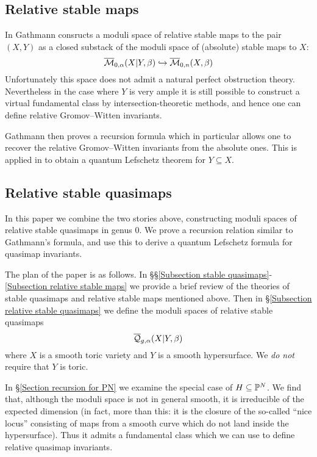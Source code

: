 \subsection{Relative stable maps}
In \cite{Ga} Gathmann consructs a moduli space of relative stable maps to the pair $(X,Y)$ as a closed substack of the moduli space of (absolute) stable maps to $X$:
\begin{equation*} \overline{\mathcal M}_{0,\alpha}(X|Y,\beta) \hookrightarrow \overline{\mathcal M}_{0,n}(X,\beta) \end{equation*}
Unfortunately this space does not admit a natural perfect obstruction theory. Nevertheless in the case where $Y$ is very ample it is still possible to construct a virtual fundamental class by intersection-theoretic methods, and hence one can define relative Gromov--Witten invariants.

Gathmann then proves a recursion formula which in particular allows one to recover the relative Gromov--Witten invariants from the absolute ones. This is  applied in \cite{Ga-MF} to obtain a quantum Lefschetz theorem for $Y \subseteq X$.

\subsection{Relative stable quasimaps}
In this paper we combine the two stories above, constructing moduli spaces of relative stable quasimaps in genus $0$. We prove a recursion relation similar to Gathmann's formula, and use this to derive a quantum Lefschetz formula for quasimap invariants.

The plan of the paper is as follows. In \S\S \ref{Subsection stable quasimaps}-\ref{Subsection relative stable maps} we provide a brief review of the theories of stable quasimaps and relative stable maps mentioned above. Then in \S \ref{Subsection relative stable quasimaps} we define the moduli spaces of relative stable quasimaps
\begin{equation*} \overline{\mathcal Q}_{g,\alpha}(X|Y,\beta) \end{equation*}
where $X$ is a smooth toric variety and $Y$ is a smooth hypersurface. We \emph{do not} require that $Y$ is toric.

In \S \ref{Section recursion for PN} we examine the special case of $H \subseteq \mathbb P^N$. We find that, although the moduli space is not in general smooth, it is irreducible of the expected dimension (in fact, more than this: it is the closure of the so-called ``nice locus'' consisting of maps from a smooth curve which do not land inside the hypersurface). Thus it admits a fundamental class which we can use to define relative quasimap invariants.

